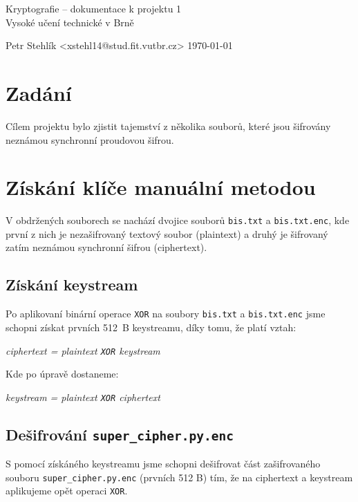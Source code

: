 \documentclass[11pt,a4paper]{article}
\begin{document}
\begin{center}
	\LARGE{Kryptografie -- dokumentace k projektu 1}\\
	\large{Vysoké učení technické v Brně}
	\vspace{0.2cm}

	Petr Stehlík <xstehl14@stud.fit.vutbr.cz>     \today

\end{center}

\section{Zadání}

Cílem projektu bylo zjistit tajemství z několika souborů, které jsou šifrovány neznámou synchronní proudovou šifrou.


\section{Získání klíče manuální metodou}

V obdržených souborech se nachází dvojice souborů \texttt{bis.txt} a \texttt{bis.txt.enc}, kde první z nich je
nezašifrovaný textový soubor (plaintext) a druhý je šifrovaný zatím neznámou synchronní šifrou (ciphertext).

\subsection{Získání keystream}

Po aplikovaní binární operace \texttt{XOR} na soubory \texttt{bis.txt} a \texttt{bis.txt.enc} jsme schopni získat
prvních 512~B keystreamu, díky tomu, že platí vztah:

\begin{center}
    \textit{ciphertext = plaintext \texttt{XOR} keystream}
\end{center}

Kde po úpravě dostaneme:

\begin{center}
    \textit{keystream = plaintext \texttt{XOR} ciphertext}
\end{center}


\subsection{Dešifrování \texttt{super\_cipher.py.enc}}

S pomocí získáného keystreamu jsme schopni dešifrovat část zašifrovaného souboru \texttt{super\_cipher.py.enc}
(prvních 512 B) tím, že na ciphertext a keystream aplikujeme opět operaci \texttt{XOR}.
\end{document}
